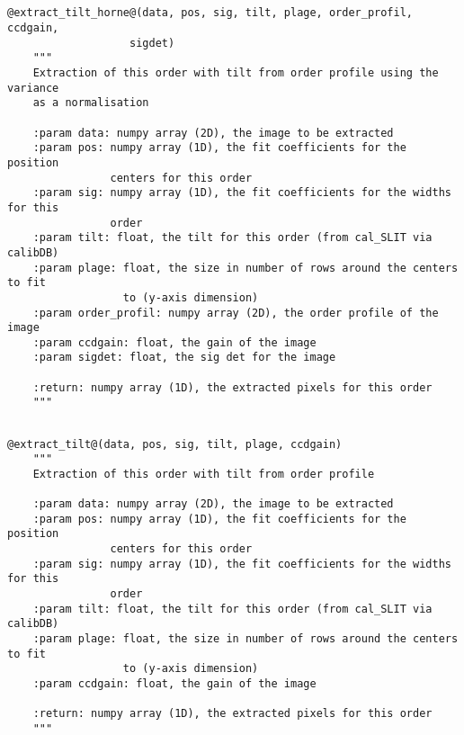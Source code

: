 \subsection{}
\begin{lstlisting}[style=pythonstyle]
@extract_tilt_horne@(data, pos, sig, tilt, plage, order_profil, ccdgain,
                   sigdet)
    """
    Extraction of this order with tilt from order profile using the variance
    as a normalisation

    :param data: numpy array (2D), the image to be extracted
    :param pos: numpy array (1D), the fit coefficients for the position
                centers for this order
    :param sig: numpy array (1D), the fit coefficients for the widths for this
                order
    :param tilt: float, the tilt for this order (from cal_SLIT via calibDB)
    :param plage: float, the size in number of rows around the centers to fit
                  to (y-axis dimension)
    :param order_profil: numpy array (2D), the order profile of the image
    :param ccdgain: float, the gain of the image
    :param sigdet: float, the sig det for the image

    :return: numpy array (1D), the extracted pixels for this order
    """
\end{lstlisting}

\subsection{}
\begin{lstlisting}[style=pythonstyle]
@extract_tilt@(data, pos, sig, tilt, plage, ccdgain)
    """
    Extraction of this order with tilt from order profile

    :param data: numpy array (2D), the image to be extracted
    :param pos: numpy array (1D), the fit coefficients for the position
                centers for this order
    :param sig: numpy array (1D), the fit coefficients for the widths for this
                order
    :param tilt: float, the tilt for this order (from cal_SLIT via calibDB)
    :param plage: float, the size in number of rows around the centers to fit
                  to (y-axis dimension)
    :param ccdgain: float, the gain of the image

    :return: numpy array (1D), the extracted pixels for this order
    """
\end{lstlisting}

